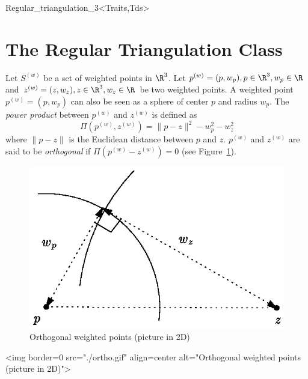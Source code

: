 \begin{ccClassTemplate}{Regular_triangulation_3<Traits,Tds>}
\section{The Regular Triangulation Class\\ \protect
{} }
\label{Triangulation3-sec-class-Regulartriangulation}

\ccDefinition

Let ${S}^{(w)}$ be a set of weighted points in $\R^3$. Let
${p}^{(w)}=(p,w_p), p\in\R^3, w_p\in\R$ and 
${z}^{(w)}=(z,w_z), z\in\R^3, w_z\in\R$ be two weighted points. 
A weighted point
${p}^{(w)}=(p,w_p)$ can also be seen as a sphere of center $p$ and
radius $w_p$. 
The \textit{power product} between ${p}^{(w)}$ and ${z}^{(w)}$ is
defined as 
\[\Pi({p}^{(w)},{z}^{(w)}) = {\|{p-z}\|^2-w_p^2-w_z^2}\]
where $\|{p-z}\|$ is the Euclidean distance between $p$ and $z$. 
 ${p}^{(w)}$ and ${z}^{(w)}$
are said to be \textit{orthogonal} if $\Pi{({p}^{(w)}-{z}^{(w)})}
= 0$ (see Figure~\ref{Triangulation3-fig-ortho}).

\begin{ccTexOnly}
\begin{figure}[htbp]
\begin{center} 
\includegraphics{ortho.eps} 
\end{center}
\caption{Orthogonal weighted points (picture in 2D)
\label{Triangulation3-fig-ortho}}
\end{figure} 
\end{ccTexOnly}

\begin{ccHtmlOnly}
<img border=0 src="./ortho.gif" align=center alt="Orthogonal weighted
points (picture in 2D)"> 
\end{ccHtmlOnly}


\end{ccClassTemplate}
